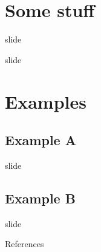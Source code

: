 \documentclass[xcolor=dvipsnames]{beamer}
\begin{document}
  \section{Some stuff}

  \begin{frame}{slide}
  \end{frame}

  \begin{frame}{slide}
  \end{frame}

  \section{Examples}

  \subsection{Example A}

  \begin{frame}{slide}
  \end{frame}

  \subsection{Example B}

  \begin{frame}{slide}
    \citep{tf}
  \end{frame}

  \begin{frame}{References}
    
  \end{frame}
\end{document}
